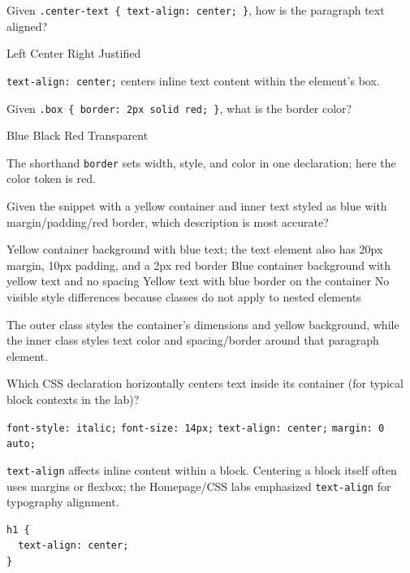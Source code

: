 \question[4]
Given \texttt{.center-text \{ text-align: center; \}}, how is the paragraph text aligned?
\begin{choices}
  \choice Left
  \CorrectChoice Center
  \choice Right
  \choice Justified
\end{choices}
\begin{solution}
  \texttt{text-align: center;} centers inline text content within the element's box.
\end{solution}

\question[4]
Given \texttt{.box \{ border: 2px solid red; \}}, what is the border color?
\begin{choices}
  \choice Blue
  \choice Black
  \CorrectChoice Red
  \choice Transparent
\end{choices}
\begin{solution}
  The shorthand \texttt{border} sets width, style, and color in one declaration; here the color token is red.
\end{solution}

\question[4]
Given the snippet with a yellow container and inner text styled as blue with margin/padding/red border, which description is most accurate?
\begin{choices}
  \CorrectChoice Yellow container background with blue text; the text element also has 20px margin, 10px padding, and a 2px red border
  \choice Blue container background with yellow text and no spacing
  \choice Yellow text with blue border on the container
  \choice No visible style differences because classes do not apply to nested elements
\end{choices}
\begin{solution}
  The outer class styles the container's dimensions and yellow background, while the inner class styles text color and spacing/border around that paragraph element.
\end{solution}


\newpage

\question[4]
Which CSS declaration horizontally centers text inside its container (for typical block contexts in the lab)?
\begin{choices}
  \choice \texttt{font-style: italic;}
  \choice \texttt{font-size: 14px;}
  \CorrectChoice \texttt{text-align: center;}
  \choice \texttt{margin: 0 auto;}
\end{choices}
\begin{solution}
  \texttt{text-align} affects inline content within a block. Centering a block itself often uses margins or flexbox; the Homepage/CSS labs emphasized \texttt{text-align} for typography alignment.
\begin{lstlisting}[style=cssexam]
h1 {
  text-align: center;
}
\end{lstlisting}
\end{solution}

